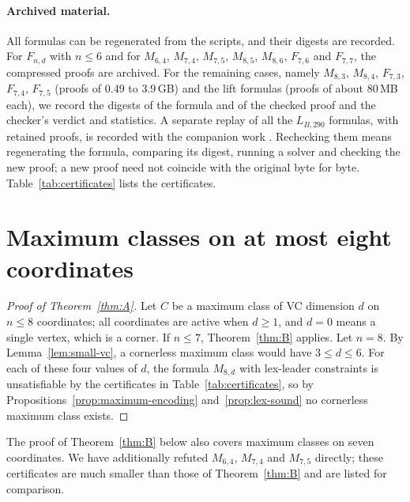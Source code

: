 \documentclass[11pt]{article}
\numberwithin{equation}{section}
\theoremstyle{definition}
\theoremstyle{remark}
\begin{document}
\paragraph{Archived material.}
All formulas can be regenerated from the scripts, and their digests are
recorded.  For \(F_{n,d}\) with \(n\le6\) and for \(M_{6,4}\), \(M_{7,4}\),
\(M_{7,5}\), \(M_{8,5}\), \(M_{8,6}\), \(F_{7,6}\) and \(F_{7,7}\), the
compressed proofs are archived.  For the remaining cases, namely
\(M_{8,3}\), \(M_{8,4}\), \(F_{7,3}\), \(F_{7,4}\), \(F_{7,5}\) (proofs of
\(0.49\) to \(3.9\)\,GB) and the lift formulas (proofs of about
\(80\)\,MB each), we record the digests of the formula and of the checked
proof and the checker's verdict and statistics.  A separate replay of all
the \(L_{B,290}\) formulas, with retained proofs, is recorded with the
companion work \cite{BousquetDampReader}.  Rechecking them means regenerating the
formula, comparing its digest, running a solver and checking the new proof;
a new proof need not coincide with the original byte for byte.
Table~\ref{tab:certificates} lists the certificates.

\section{Maximum classes on at most eight coordinates}
\label{sec:maximum}

\begin{proof}[Proof of Theorem~\ref{thm:A}]
Let \(C\) be a maximum class of VC dimension \(d\) on \(n\le8\)
coordinates; all coordinates are active when \(d\ge1\), and \(d=0\) means
a single vertex, which is a corner.  If \(n\le7\), Theorem~\ref{thm:B}
applies.  Let \(n=8\).  By Lemma~\ref{lem:small-vc}, a cornerless
maximum class would have \(3\le d\le6\).  For each of these four values of
\(d\), the formula \(M_{8,d}\) with lex-leader constraints is unsatisfiable
by the certificates in Table~\ref{tab:certificates}, so by
Propositions~\ref{prop:maximum-encoding} and~\ref{prop:lex-sound} no
cornerless maximum class exists.
\end{proof}

The proof of Theorem~\ref{thm:B} below also covers maximum classes on
seven coordinates.  We have additionally refuted \(M_{6,4}\), \(M_{7,4}\) and
\(M_{7,5}\) directly; these certificates are much smaller than those of
Theorem~\ref{thm:B} and are listed for comparison.
\end{document}
